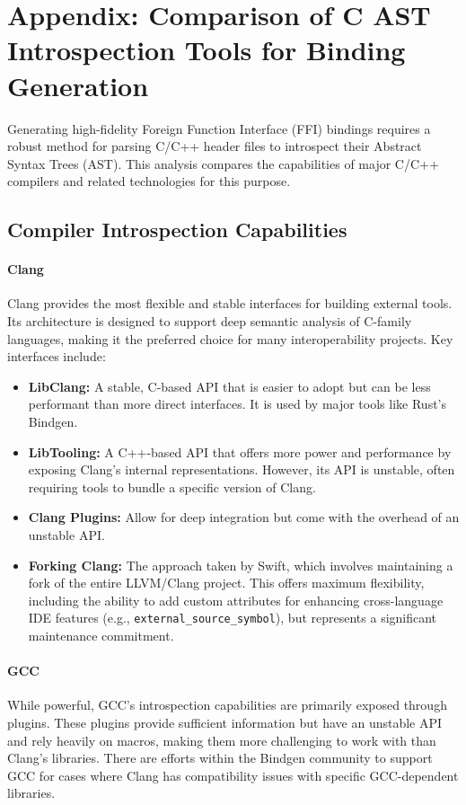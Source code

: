 \section{Appendix: Comparison of C AST Introspection Tools for Binding Generation}
\label{app:c_ast_introspection_tools}


Generating high-fidelity Foreign Function Interface (FFI) bindings requires a robust method for parsing C/C++ header files to introspect their Abstract Syntax Trees (AST). This analysis compares the capabilities of major C/C++ compilers and related technologies for this purpose.

\subsection{Compiler Introspection Capabilities}

\paragraph{Clang}
Clang provides the most flexible and stable interfaces for building external tools. Its architecture is designed to support deep semantic analysis of C-family languages, making it the preferred choice for many interoperability projects. Key interfaces include:
\begin{itemize}
    \item \textbf{LibClang:} A stable, C-based API that is easier to adopt but can be less performant than more direct interfaces. It is used by major tools like Rust's Bindgen.
    \item \textbf{LibTooling:} A C++-based API that offers more power and performance by exposing Clang's internal representations. However, its API is unstable, often requiring tools to bundle a specific version of Clang.
    \item \textbf{Clang Plugins:} Allow for deep integration but come with the overhead of an unstable API.
    \item \textbf{Forking Clang:} The approach taken by Swift, which involves maintaining a fork of the entire LLVM/Clang project. This offers maximum flexibility, including the ability to add custom attributes for enhancing cross-language IDE features (e.g., \texttt{external\_source\_symbol}), but represents a significant maintenance commitment.
\end{itemize}

\paragraph{GCC}
While powerful, GCC's introspection capabilities are primarily exposed through plugins. These plugins provide sufficient information but have an unstable API and rely heavily on macros, making them more challenging to work with than Clang's libraries. There are efforts within the Bindgen community to support GCC for cases where Clang has compatibility issues with specific GCC-dependent libraries.

